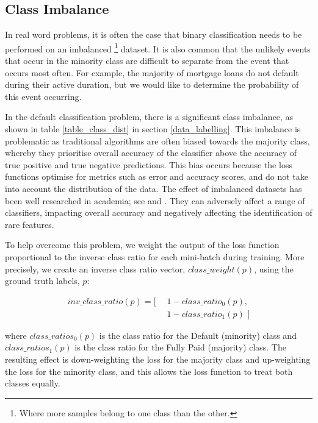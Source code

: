         \subsection{Class Imbalance} \label{class_imbalance}
            In real word problems, it is often the case that binary classification needs to be performed on an imbalanced \footnote{Where more samples belong to one class than the other.} dataset. It is also common that the unlikely events that occur in the minority class are difficult to separate from the event that occurs most often. For example, the majority of mortgage loans do not default during their active duration, but we would like to determine the probability of this event occurring. 
            
            In the default classification problem, there is a significant class imbalance, as shown in table \ref{table_class_dist} in section \ref{data_labelling}. This imbalance is problematic as traditional algorithms are often biased towards the majority class, whereby they prioritise overall accuracy of the classifier above the accuracy of true positive and true negative predictions. This bias occurs because the loss functions optimise for metrics such as error and accuracy scores, and do not take into account the distribution of the data. The effect of imbalanced datasets has been well researched in academia; see \cite{random_subspace_method} and \cite{imbalanced_dataset_thesis}. They can adversely affect a range of classifiers, impacting overall accuracy and negatively affecting the identification of rare features. 
            
            To help overcome this problem, we weight the output of the loss function proportional to the inverse class ratio for each mini-batch during training. More precisely, we create an inverse class ratio vector, $class\_weight(p)$, using the ground truth labels, $p$:
            
            \begin{align}
                inv\_class\_ratio(p) = [\,
                & \, 
                    \, 1 - class\_ratio_0(p) , 
                    \nonumber \\
                & \,
                    \, 1 - class\_ratio_1(p) \, \,]
            \end{align}
            
            where $class\_ratios_0(p)$ is the class ratio for the Default (minority) class and $class\_ratios_1(p)$ is the class ratio for the Fully Paid (majority) class. The resulting effect is down-weighting the loss for the majority class and up-weighting the loss for the minority class, and this allows the loss function to treat both classes equally. 
            
